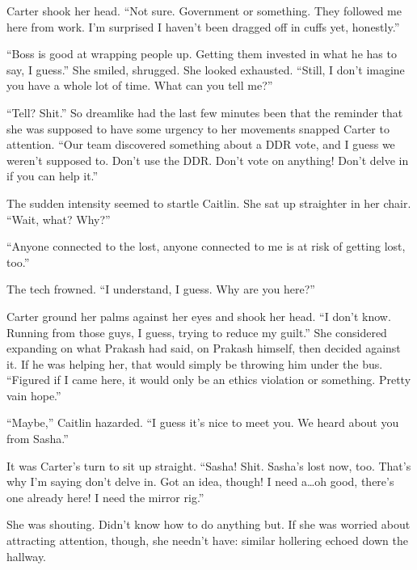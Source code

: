 Carter shook her head. ``Not sure. Government or something. They followed me here from work. I'm surprised I haven't been dragged off in cuffs yet, honestly.''

``Boss is good at wrapping people up. Getting them invested in what he has to say, I guess.'' She smiled, shrugged. She looked exhausted. ``Still, I don't imagine you have a whole lot of time. What can you tell me?''

``Tell? Shit.'' So dreamlike had the last few minutes been that the reminder that she was supposed to have some urgency to her movements snapped Carter to attention. ``Our team discovered something about a DDR vote, and I guess we weren't supposed to. Don't use the DDR. Don't vote on anything! Don't delve in if you can help it.''

The sudden intensity seemed to startle Caitlin. She sat up straighter in her chair. ``Wait, what? Why?''

``Anyone connected to the lost, anyone connected to me is at risk of getting lost, too.''

The tech frowned. ``I understand, I guess. Why are you here?''

Carter ground her palms against her eyes and shook her head. ``I don't know. Running from those guys, I guess, trying to reduce my guilt.'' She considered expanding on what Prakash had said, on Prakash himself, then decided against it. If he was helping her, that would simply be throwing him under the bus. ``Figured if I came here, it would only be an ethics violation or something. Pretty vain hope.''

``Maybe,'' Caitlin hazarded. ``I guess it's nice to meet you. We heard about you from Sasha.''

It was Carter's turn to sit up straight. ``Sasha! Shit. Sasha's lost now, too. That's why I'm saying don't delve in. Got an idea, though! I need a\ldots{}oh good, there's one already here! I need the mirror rig.''

She was shouting. Didn't know how to do anything but. If she was worried about attracting attention, though, she needn't have: similar hollering echoed down the hallway.
